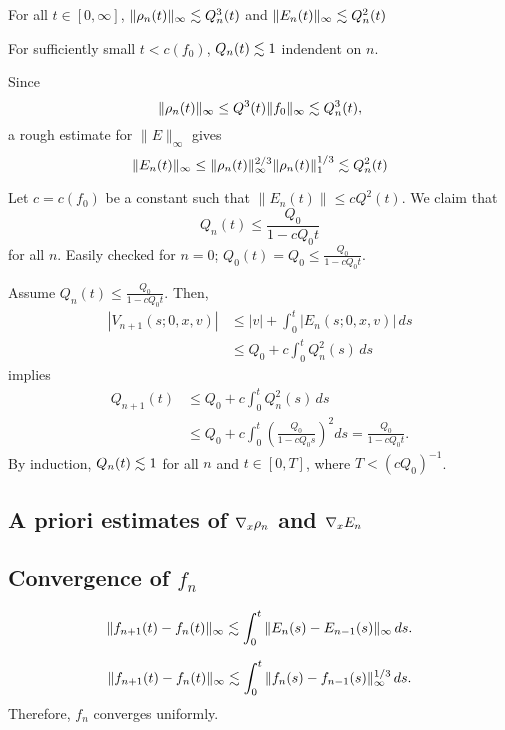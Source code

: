 \documentclass[11pt]{amsart}
\begin{document}
\begin{lem}$ $\\[-12pt]
\begin{cond}
\item
For all $t\in[0,\infty]$, $\|\rho_n(t)\|_\infty\lesssim Q_n^3(t)$ and $\|E_n(t)\|_\infty\lesssim Q_n^2(t)$
\item
For sufficiently small $t<c(f_0)$, $Q_n(t)\lesssim1$ indendent on $n$.
\end{cond}
\end{lem}
\begin{pfs}
\item
Since
\[\|\rho_n(t)\|_\infty\le Q^3(t)\|f_0\|_\infty\lesssim Q_n^3(t),\]
a rough estimate for $\|E\|_\infty$ gives
\[\|E_n(t)\|_\infty\le\|\rho_n(t)\|_\infty^{2/3}\|\rho_n(t)\|_1^{1/3}\lesssim Q_n^2(t)\]
\item
Let $c=c(f_0)$ be a constant such that $\|E_n(t)\|\le cQ^2(t)$.
We claim that
\[Q_n(t)\le\frac{Q_0}{1-cQ_0t}\]
for all $n$.
Easily checked for $n=0$; $Q_0(t)=Q_0\le\frac{Q_0}{1-cQ_0t}$.

Assume $Q_n(t)\le\frac{Q_0}{1-cQ_0t}$.
Then,
\begin{align*}
|V_{n+1}(s;0,x,v)|
&\le|v|+\int_0^t|E_n(s;0,x,v)|\,ds\\
&\le Q_0+c\int_0^tQ_n^2(s)\,ds
\end{align*}
implies
\begin{align*}
Q_{n+1}(t)
&\le Q_0+c\int_0^tQ_n^2(s)\,ds\\
&\le Q_0+c\int_0^t\left(\frac{Q_0}{1-cQ_0s}\right)^2ds
=\frac{Q_0}{1-cQ_0t}.
\end{align*}
By induction, $Q_n(t)\lesssim1$ for all $n$ and $t\in[0,T]$, where $T<(cQ_0)^{-1}$.\qedhere
\end{pfs}

\subsection{A priori estimates of $\nabla_x\rho_n$ and $\nabla_xE_n$}


\subsection{Convergence of $f_n$}


\begin{cond}
\item\[\|f_{n+1}(t)-f_n(t)\|_\infty\lesssim\int_0^t\|E_n(s)-E_{n-1}(s)\|_\infty\,ds.\]
\item\[\|f_{n+1}(t)-f_n(t)\|_\infty\lesssim\int_0^t\|f_n(s)-f_{n-1}(s)\|_\infty^{1/3}\,ds.\]
Therefore, $f_n$ converges uniformly.
\end{cond}
\end{document}

